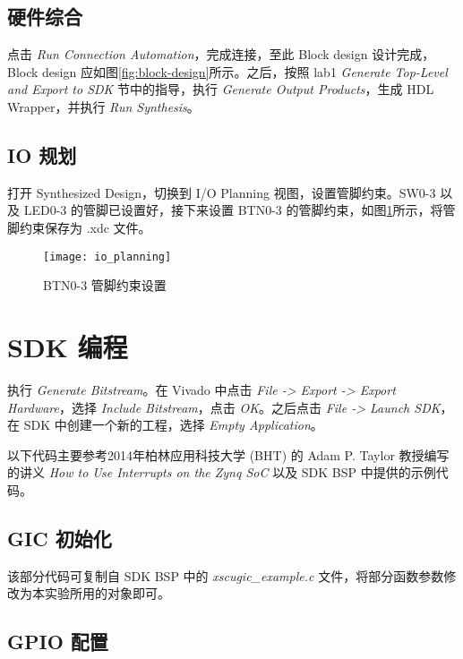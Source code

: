 \documentclass{sjtureport}
\begin{document}
\subsection{硬件综合}

点击 \textit{Run Connection Automation}，完成连接，至此 Block design 设计完成， Block design 应如图\ref{fig:block-design}所示。之后，按照 lab1 \textit{Generate Top-Level and Export to SDK} 节中的指导，执行 \textit{Generate Output Products}，生成 HDL Wrapper，并执行 \textit{Run Synthesis}。

\subsection{IO 规划}
\label{sec:io-planning}

打开 Synthesized Design，切换到 I/O Planning 视图，设置管脚约束。SW0-3 以及 LED0-3 的管脚已设置好，接下来设置 BTN0-3 的管脚约束，如图\ref{fig:io-planning}所示，将管脚约束保存为 .xdc 文件。

\begin{figure}[!htp]
	\centering
	\texttt{[image: io\_planning]}
	\caption{BTN0-3 管脚约束设置}
	\label{fig:io-planning}
\end{figure}

\section{SDK 编程}

执行 \textit{Generate Bitstream}。在 Vivado 中点击 \textit{File -> Export -> Export Hardware}，选择 \textit{Include Bitstream}，点击 \textit{OK}。之后点击 \textit{File -> Launch SDK}，在 SDK 中创建一个新的工程，选择 \textit{Empty Application}。

以下代码主要参考2014年柏林应用科技大学 (BHT) 的 Adam P. Taylor 教授编写的讲义 \textit{How to Use Interrupts on the Zynq SoC} 以及 SDK BSP 中提供的示例代码。

\subsection{GIC 初始化}

该部分代码可复制自 SDK BSP 中的 \textit{xscugic\_example.c} 文件，将部分函数参数修改为本实验所用的对象即可。

\subsection{GPIO 配置}
\end{document}
